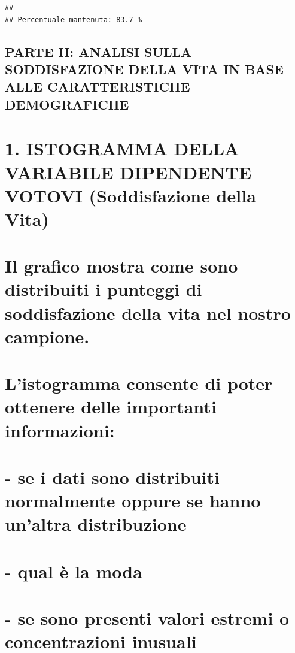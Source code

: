 \documentclass[
]{article}
\begin{document}
\begin{verbatim}
## 
## Percentuale mantenuta: 83.7 %
\end{verbatim}

\subsection{PARTE II: ANALISI SULLA SODDISFAZIONE DELLA VITA IN BASE
ALLE CARATTERISTICHE
DEMOGRAFICHE}\label{parte-ii-analisi-sulla-soddisfazione-della-vita-in-base-alle-caratteristiche-demografiche}

\section{1. ISTOGRAMMA DELLA VARIABILE DIPENDENTE VOTOVI (Soddisfazione
della
Vita)}\label{istogramma-della-variabile-dipendente-votovi-soddisfazione-della-vita}

\section{Il grafico mostra come sono distribuiti i punteggi di
soddisfazione della vita nel nostro
campione.}\label{il-grafico-mostra-come-sono-distribuiti-i-punteggi-di-soddisfazione-della-vita-nel-nostro-campione.}

\section{L'istogramma consente di poter ottenere delle importanti
informazioni:}\label{listogramma-consente-di-poter-ottenere-delle-importanti-informazioni}

\section{- se i dati sono distribuiti normalmente oppure se hanno
un'altra
distribuzione}\label{se-i-dati-sono-distribuiti-normalmente-oppure-se-hanno-unaltra-distribuzione}

\section{- qual è la moda}\label{qual-uxe8-la-moda}

\section{- se sono presenti valori estremi o concentrazioni
inusuali}\label{se-sono-presenti-valori-estremi-o-concentrazioni-inusuali}
\end{document}
